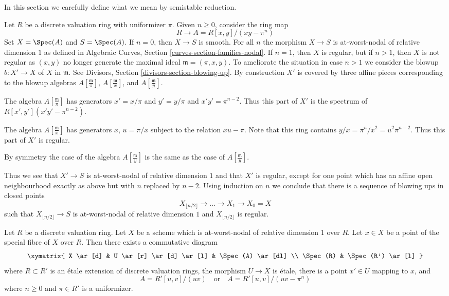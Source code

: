 \noindent
In this section we carefully define what we mean by semistable reduction.

\begin{example}
\label{example-blowup}
Let $R$ be a discrete valuation ring with uniformizer $\pi$.
Given $n \geq 0$, consider the ring map
$$
R \longrightarrow A = R[x, y]/(xy - \pi^n)
$$
Set $X = \Spec(A)$ and $S = \Spec(A)$.
If $n = 0$, then $X \to S$ is smooth.
For all $n$ the morphism $X \to S$ is at-worst-nodal
of relative dimension $1$ as defined in
Algebraic Curves, Section \ref{curves-section-families-nodal}.
If $n = 1$, then $X$ is regular, but if $n > 1$, then $X$ is not
regular as $(x, y)$ no longer generate the maximal ideal
$\mathfrak m = (\pi, x, y)$. To ameliorate the situation
in case $n > 1$ we
consider the blowup $b : X' \to X$ of $X$ in $\mathfrak m$.
See Divisors, Section \ref{divisors-section-blowing-up}.
By construction $X'$ is covered by three affine pieces
corresponding to the blowup algebras $A[\frac{\mathfrak m}{\pi}]$,
$A[\frac{\mathfrak m}{x}]$, and $A[\frac{\mathfrak m}{y}]$.

\medskip\noindent
The algebra $A[\frac{\mathfrak m}{\pi}]$ has generators
$x' = x/\pi$ and $y' = y/\pi$ and $x'y' = \pi^{n - 2}$.
Thus this part of $X'$ is the spectrum of $R[x', y'](x'y' - \pi^{n - 2})$.

\medskip\noindent
The algebra $A[\frac{\mathfrak m}{x}]$ has generators $x$,
$u = \pi/x$ subject to the relation $xu - \pi$. Note that this ring
contains $y/x = \pi^n/x^2 = u^2\pi^{n - 2}$. Thus this part of
$X'$ is regular.

\medskip\noindent
By symmetry the case of the algebra $A[\frac{\mathfrak m}{y}]$ is
the same as the case of $A[\frac{\mathfrak m}{y}]$.

\medskip\noindent
Thus we see that $X' \to S$ is at-worst-nodal of relative dimension $1$
and that $X'$ is regular, except for one point which has an
affine open neighbourhood exactly as above but with $n$ replaced by $n - 2$.
Using induction on $n$ we conclude that there is a sequence of
blowing ups in closed points
$$
X_{\lfloor n/2 \rfloor} \to \ldots \to X_1 \to X_0 = X
$$
such that $X_{\lfloor n/2 \rfloor} \to S$ is
at-worst-nodal of relative dimension $1$ and
$X_{\lfloor n/2 \rfloor}$ is regular.
\end{example}

\begin{lemma}
\label{lemma-etale-local-at-worst-nodal}
Let $R$ be a discrete valuation ring. Let $X$ be a scheme which is
at-worst-nodal of relative dimension $1$ over $R$.
Let $x \in X$ be a point of the special fibre
of $X$ over $R$. Then there exists a commutative diagram
$$
\xymatrix{
X \ar[d] &
U \ar[r] \ar[d] \ar[l] &
\Spec(A) \ar[dl] \\
\Spec(R) &
\Spec(R') \ar[l]
}
$$
where $R \subset R'$ is an \'etale extension of discrete valuation rings,
the morphism $U \to X$ is \'etale, there is a
point $x' \in U$ mapping to $x$, and
$$
A = R'[u, v]/(uv)
\quad\text{or}\quad
A = R'[u, v]/(uv - \pi^n)
$$
where $n \geq 0$ and $\pi \in R'$ is a uniformizer.
\end{lemma}

